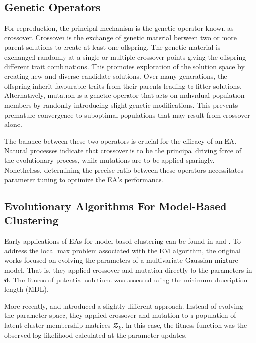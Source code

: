 \documentclass[12pt]{report}
\begin{document}
\subsection{Genetic Operators}
For reproduction, the principal mechanism is the genetic operator known as crossover. Crossover is the exchange of genetic material between two or more parent solutions to create at least one offspring. The genetic material is exchanged randomly at a single or multiple crossover points giving the offspring different trait combinations. This promotes exploration of the solution space by creating new and diverse candidate solutions. Over many generations, the offspring inherit favourable traits from their parents leading to fitter solutions. Alternatively, mutation is a genetic operator that acts on individual population members by randomly introducing slight genetic modifications. This prevents premature convergence to suboptimal populations that may result from crossover alone. 

The balance between these two operators is crucial for the efficacy of an EA. Natural processes indicate that crossover is to be the principal driving force of the evolutionary process, while mutations are to be applied sparingly. Nonetheless, determining the precise ratio between these operators necessitates parameter tuning to optimize the EA's performance.




\subsection{Evolutionary Algorithms For Model-Based Clustering}
Early applications of EAs for model-based clustering can be found in \citet{martinez2000} and \citet{pernkopf2005}. To address the local max problem associated with the EM algorithm, the original works focused on evolving the parameters of a multivariate Gaussian mixture model. That is, they applied crossover and mutation directly to the parameters in $\bm{\vartheta}$. The fitness of potential solutions was assessed using the minimum description length (MDL). 

More recently, \citet{andrews2013} and \citet{mcnicholas2020} introduced a slightly different approach. Instead of evolving the parameter space, they applied crossover and mutation to a population of latent cluster membership matrices $\mathbfcal{Z}_k$. In this case, the fitness function was the observed-log likelihood calculated at the parameter updates. 
\end{document}
